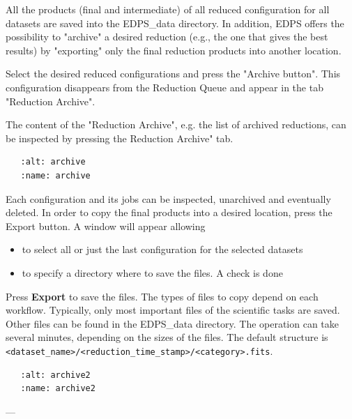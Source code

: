 \documentclass{article}
\begin{document}
All the products (final and intermediate) of all reduced configuration for all datasets are saved into
the EDPS_data directory. In addition, EDPS offers the possibility to "archive" a desired reduction (e.g., the one
that gives the best results) by "exporting" only the final reduction products into another location.

Select the desired reduced configurations and press the "Archive button". This configuration disappears from the
Reduction Queue and appear in the tab "Reduction Archive".

The content of the "Reduction Archive", e.g. the list of archived reductions, can be inspected by pressing the
\textit{}Reduction Archive" tab.

\begin{verbatim}
   :alt: archive
   :name: archive
\end{verbatim}

Each configuration and its jobs can be inspected, unarchived and eventually deleted.
In order to copy the final products into a desired location, press the Export button. A window will appear
allowing 
\begin{itemize}
\item to select all or just the last configuration for the selected datasets
\end{itemize}
\begin{itemize}
\item to specify a directory where to save the files. A check is done
\end{itemize}

Press \textbf{Export} to save the files.
The types of files to copy depend on each workflow. Typically, only most important files of the 
scientific tasks are saved. Other files can be found in the EDPS_data directory.
The operation can take several minutes, depending on the sizes of the files.
The default structure is \texttt{<dataset_name>/<reduction_time_stamp>/<category>.fits}.

\begin{verbatim}
   :alt: archive2
   :name: archive2
\end{verbatim}
---

            
\end{document}
